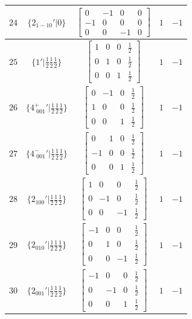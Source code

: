 \documentclass[fleqn,8pt]{jsarticle}
\begin{document}
\begin{longtable}{ccccc}
$ 24 $ & $ \{2{}_{1-10}{}'|0\} $ & $ \begin{bmatrix} 0 & -1 & 0 & 0 \\ -1 & 0 & 0 & 0 \\ 0 & 0 & -1 & 0 \end{bmatrix} $ & $ 1 $ & $ -1 $ \\ \hline
$ 25 $ & $ \{1{}'|\frac{1}{2} \frac{1}{2} \frac{1}{2}\} $ & $ \begin{bmatrix} 1 & 0 & 0 & \frac{1}{2} \\ 0 & 1 & 0 & \frac{1}{2} \\ 0 & 0 & 1 & \frac{1}{2} \end{bmatrix} $ & $ 1 $ & $ -1 $ \\ \hline
$ 26 $ & $ \{4^{+}_{\,\,001}{}'|\frac{1}{2} \frac{1}{2} \frac{1}{2}\} $ & $ \begin{bmatrix} 0 & -1 & 0 & \frac{1}{2} \\ 1 & 0 & 0 & \frac{1}{2} \\ 0 & 0 & 1 & \frac{1}{2} \end{bmatrix} $ & $ 1 $ & $ -1 $ \\ \hline
$ 27 $ & $ \{4^{-}_{\,\,001}{}'|\frac{1}{2} \frac{1}{2} \frac{1}{2}\} $ & $ \begin{bmatrix} 0 & 1 & 0 & \frac{1}{2} \\ -1 & 0 & 0 & \frac{1}{2} \\ 0 & 0 & 1 & \frac{1}{2} \end{bmatrix} $ & $ 1 $ & $ -1 $ \\ \hline
$ 28 $ & $ \{2{}_{100}{}'|\frac{1}{2} \frac{1}{2} \frac{1}{2}\} $ & $ \begin{bmatrix} 1 & 0 & 0 & \frac{1}{2} \\ 0 & -1 & 0 & \frac{1}{2} \\ 0 & 0 & -1 & \frac{1}{2} \end{bmatrix} $ & $ 1 $ & $ -1 $ \\ \hline
$ 29 $ & $ \{2{}_{010}{}'|\frac{1}{2} \frac{1}{2} \frac{1}{2}\} $ & $ \begin{bmatrix} -1 & 0 & 0 & \frac{1}{2} \\ 0 & 1 & 0 & \frac{1}{2} \\ 0 & 0 & -1 & \frac{1}{2} \end{bmatrix} $ & $ 1 $ & $ -1 $ \\ \hline
$ 30 $ & $ \{2{}_{001}{}'|\frac{1}{2} \frac{1}{2} \frac{1}{2}\} $ & $ \begin{bmatrix} -1 & 0 & 0 & \frac{1}{2} \\ 0 & -1 & 0 & \frac{1}{2} \\ 0 & 0 & 1 & \frac{1}{2} \end{bmatrix} $ & $ 1 $ & $ -1 $ \\ \hline

\end{longtable}
\end{document}
